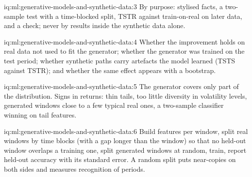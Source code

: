\begin{solution}{iq:ml:generative-models-and-synthetic-data:3}
By purpose: stylised facts, a two-sample test with a time-blocked split, TSTR against train-on-real on later data, and a
 check; never by results inside the synthetic data alone.
\end{solution}

\begin{solution}{iq:ml:generative-models-and-synthetic-data:4}
Whether the improvement holds on real data not used to fit the generator; whether the generator was trained on the test
period; whether synthetic paths carry artefacts the model learned (TSTS against TSTR); and whether the same effect appears
with a bootstrap.
\end{solution}

\begin{solution}{iq:ml:generative-models-and-synthetic-data:5}
The generator covers only part of the distribution. Signs in returns: thin tails, too little diversity in volatility
levels, generated windows close to a few typical real ones, a two-sample classifier winning on tail features.
\end{solution}

\begin{solution}{iq:ml:generative-models-and-synthetic-data:6}
Build features per window, split real windows by time blocks (with a gap longer than the window) so that no held-out
window overlaps a training one, split generated windows at random, train, report held-out accuracy with its standard error.
A random split puts near-copies on both sides and measures recognition of periods.
\end{solution}
